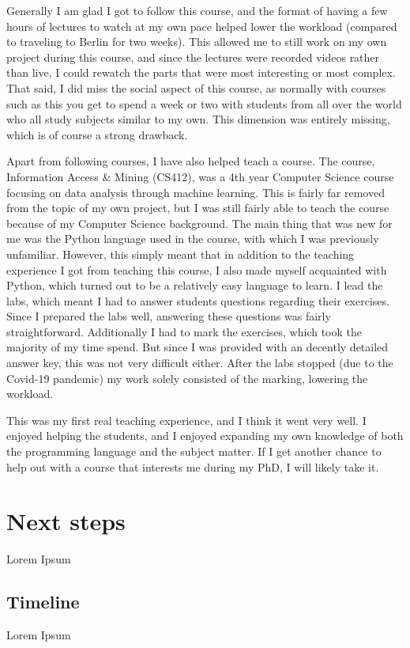 \documentclass[a4paper,12pt]{article}
\begin{document}
Generally I am glad I got to follow this course, and the format of having a few hours of lectures to watch at my own pace helped lower the workload (compared to traveling to Berlin for two weeks). This allowed me to still work on my own project during this course, and since the lectures were recorded videos rather than live, I could rewatch the parts that were most interesting or most complex. That said, I did miss the social aspect of this course, as normally with courses such as this you get to spend a week or two with students from all over the world who all study subjects similar to my own. This dimension was entirely missing, which is of course a strong drawback. 

\bigskip

Apart from following courses, I have also helped teach a course. The course, Information Access \& Mining (CS412), was a 4th year Computer Science course focusing on data analysis through machine learning. This is fairly far removed from the topic of my own project, but I was still fairly able to teach the course because of my Computer Science background. The main thing that was new for me was the Python language used in the course, with which I was previously unfamiliar. However, this simply meant that in addition to the teaching experience I got from teaching this course, I also made myself acquainted with Python, which turned out to be a relatively easy language to learn. I lead the labs, which meant I had to answer students questions regarding their exercises. Since I prepared the labs well, answering these questions was fairly straightforward. Additionally I had to mark the exercises, which took the majority of my time spend. But since I was provided with an decently detailed answer key, this was not very difficult either. After the labs stopped (due to the Covid-19 pandemic) my work solely consisted of the marking, lowering the workload. 

This was my first real teaching experience, and I think it went very well. I enjoyed helping the students, and I enjoyed expanding my own knowledge of both the programming language and the subject matter. If I get another chance to help out with a course that interests me during my PhD, I will likely take it. %

\pagebreak

\section{Next steps}\label{s:next}
Lorem Ipsum 

\subsection{Timeline}
Lorem Ipsum 

\pagebreak



\end{document}
